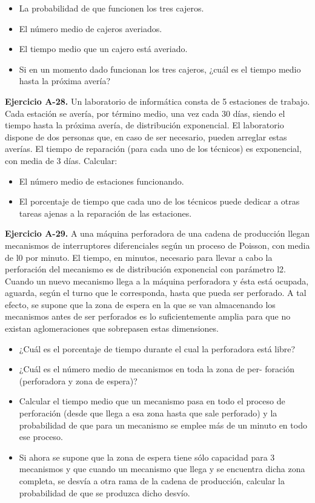 \documentclass[
]{book}
\providecommand{\tightlist}{%
  \setlength{\itemsep}{0pt}\setlength{\parskip}{0pt}}
\theoremstyle{definition}
\theoremstyle{definition}
\theoremstyle{definition}
\theoremstyle{definition}
\theoremstyle{remark}
\begin{document}
\begin{itemize}
\tightlist
\item
  La probabilidad de que funcionen los tres cajeros.
\item
  El número medio de cajeros averiados.
\item
  El tiempo medio que un cajero está averiado.
\item
  Si en un momento dado funcionan los tres cajeros, ¿cuál es el tiempo medio hasta la próxima avería?
\end{itemize}

\textbf{Ejercicio A-28.} Un laboratorio de informática consta de 5 estaciones de trabajo. Cada estación se avería, por término medio, una vez cada 30 días, siendo el tiempo hasta la próxima avería, de distribución exponencial. El laboratorio dispone de dos personas que, en caso de ser necesario, pueden arreglar estas averías. El tiempo de reparación (para cada uno de los técnicos) es exponencial, con media de 3 días. Calcular:

\begin{itemize}
\tightlist
\item
  El número medio de estaciones funcionando.
\item
  El porcentaje de tiempo que cada uno de los técnicos puede dedicar a otras tareas ajenas a la reparación de las estaciones.
\end{itemize}

\textbf{Ejercicio A-29.} A una máquina perforadora de una cadena de producción llegan mecanismos de interruptores diferenciales según un proceso de Poisson, con media de l0 por minuto. El tiempo, en minutos, necesario para llevar a cabo la perforación del mecanismo es de distribución exponencial con parámetro l2. Cuando un nuevo mecanismo llega a la máquina perforadora y ésta está ocupada, aguarda, según el turno que le corresponda, hasta que pueda ser perforado. A tal efecto, se supone que la zona de espera en la que se van almacenando los mecanismos antes de ser perforados es lo suficientemente amplia para que no existan aglomeraciones que sobrepasen estas dimensiones.

\begin{itemize}
\tightlist
\item
  ¿Cuál es el porcentaje de tiempo durante el cual la perforadora está libre?
\item
  ¿Cuál es el número medio de mecanismos en toda la zona de per- foración (perforadora y zona de espera)?
\item
  Calcular el tiempo medio que un mecanismo pasa en todo el proceso de perforación (desde que llega a esa zona hasta que sale perforado) y la probabilidad de que para un mecanismo se emplee más de un minuto en todo ese proceso.
\item
  Si ahora se supone que la zona de espera tiene sólo capacidad para 3 mecanismos y que cuando un mecanismo que llega y se encuentra dicha zona completa, se desvía a otra rama de la cadena de producción, calcular la probabilidad de que se produzca dicho desvío.
\end{itemize}
\end{document}
